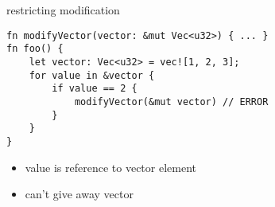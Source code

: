 
\begin{frame}[fragile,label=restrictMod]{restricting modification}
    \begin{verbatim}
fn modifyVector(vector: &mut Vec<u32>) { ... }
fn foo() {
    let vector: Vec<u32> = vec![1, 2, 3];
    for value in &vector {
        if value == 2 {
            modifyVector(&mut vector) // ERROR
        }
    }
}
    \end{verbatim}
\begin{itemize}
    \item value is reference to vector element
    \item can't give away vector
\end{itemize}
\end{frame}


